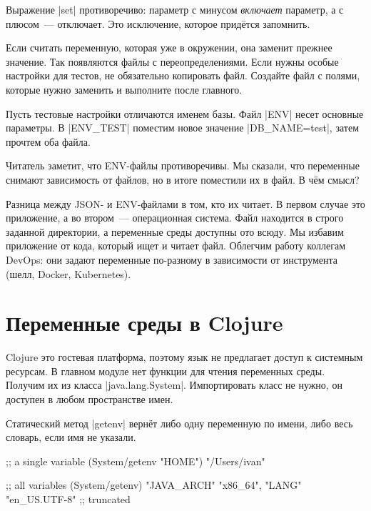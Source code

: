 Выражение \spverb|set| противоречиво: параметр с минусом \emph{включает}
параметр, а с плюсом~--- отключает. Это исключение, которое прид\"{е}тся запомнить.

Если считать переменную, которая уже в окружении, она заменит прежнее
значение. Так появляются файлы с переопределениями. Если нужны особые настройки
для тестов, не обязательно копировать файл. Создайте файл с полями,
которые нужно заменить и выполните после главного.

Пусть тестовые настройки отличаются именем базы. Файл \spverb|ENV| несет
основные параметры. В \spverb|ENV_TEST| поместим новое значение
\spverb|DB_NAME=test|, затем прочтем оба файла.

\begin{english}
\end{english}

Читатель заметит, что ENV-файлы противоречивы. Мы сказали, что переменные
снимают зависимость от файлов, но в итоге поместили их в файл. В ч\"{е}м смысл?

Разница между JSON- и ENV-файлами в том, кто их читает. В первом случае это
приложение, а во втором~--- операционная система. Файл находится в строго
заданной директории, а переменные среды доступны ото всюду. Мы избавим
приложение от кода, который ищет и читает файл. Облегчим работу коллегам DevOps:
они задают переменные по-разному в зависимости от инструмента (шелл, Docker,
Kubernetes).

\section{Переменные среды в Clojure}

Clojure это гостевая платформа, поэтому язык не предлагает доступ к системным
ресурсам. В главном модуле нет функции для чтения переменных среды. Получим их
из класса \spverb|java.lang.System|. Импортировать класс не нужно, он доступен в
любом пространстве имен.

Статический метод \spverb|getenv| верн\"{е}т либо одну переменную по имени, либо
весь словарь, если имя не указали.

\begin{english}
  \begin{clojure}
;; a single variable
(System/getenv "HOME")
"/Users/ivan"

;; all variables
(System/getenv)
{"JAVA_ARCH" "x86_64", "LANG" "en_US.UTF-8"} ;; truncated
  \end{clojure}
\end{english}

